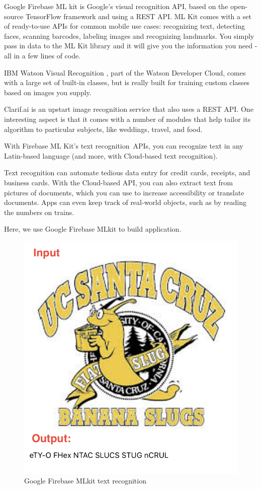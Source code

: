 \documentclass[11pt]{ucscthesis}
\begin{document}
Google Firebase ML kit \cite{GoogleMLkit} is Google’s visual recognition API, based on the open-source TensorFlow framework and using a REST API. ML Kit comes with a set of ready-to-use APIs for common mobile use cases: recognizing text, detecting faces, scanning barcodes, labeling images and recognizing landmarks. You simply pass in data to the ML Kit library and it will give you the information you need - all in a few lines of code.

IBM Watson Visual Recognition \cite{IBMclassifier}, part of the Watson Developer Cloud, comes with a large set of built-in classes, but is really built for training custom classes based on images you supply.

Clarif.ai \cite{clarif} is an upstart image recognition service that also uses a REST API. One interesting aspect is that it comes with a number of modules that help tailor its algorithm to particular subjects, like weddings, travel, and food.

With Firebase ML Kit's text recognition\ APIs, you can recognize text in any Latin-based language (and more, with Cloud-based text recognition).

Text recognition can automate tedious data entry for credit cards, receipts, and business cards. With the Cloud-based API, you can also extract text from pictures of documents, which you can use to increase accessibility or translate documents. Apps can even keep track of real-world objects, such as by reading the numbers on trains.

Here, we use Google Firebase MLkit to build application.
\begin{figure}
    \centering
    \includegraphics[width =0.4\linewidth]{Fig/OCRdemo.png}
    \caption{Google Firebase MLkit text recognition}
    \label{MLkitOCR}
\end{figure}
\end{document}

